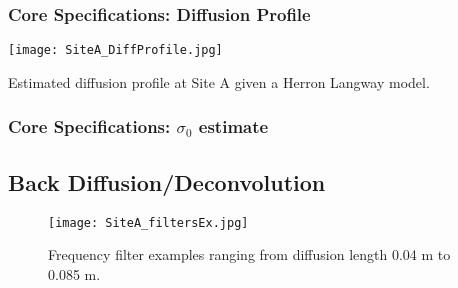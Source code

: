 \documentclass[../../CompleteThesis/Complete_1stDraft.tex]{subfiles}
\begin{document}
\subsubsection[Diffusion Profile]{Core Specifications: Diffusion Profile}
\begin{marginfigure}
	\centering
	\texttt{[image: SiteA\_DiffProfile.jpg]}
	\caption[Diffusion profile, Site A.]{\footnotesize{Estimated diffusion profile at Site A given a Herron Langway model.}}
	\label{fig:SiteADiffProfile}
\end{marginfigure}

\subsubsection[$\sigma_0$ estimate]{Core Specifications: $\sigma_0$ estimate}



\subsection[Back Diffusion]{Back Diffusion/Deconvolution}
\begin{figure}[h]
	\centering
	\texttt{[image: SiteA\_filtersEx.jpg]}
	\caption[Frequency filters example, Site A]{Frequency filter examples ranging from diffusion length 0.04 m to 0.085 m.}
	\label{fig:SiteA_filtersEx}
\end{figure}



 
 
\end{document}
